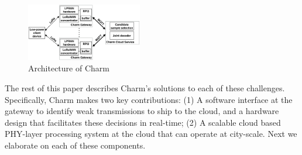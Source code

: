 \begin{figure}[!htb]
    \centering
    \compactimg
    \includegraphics[width=0.45\textwidth]{figures/charm-architecture_cropped.pdf}
    \compactimg
    \caption{Architecture of Charm}
    \label{fig:architecture}
    \compactimg
\end{figure}

The rest of this paper describes Charm's solutions to each of these
challenges. Specifically, Charm makes two key contributions: (1) A software
interface at the gateway to identify weak transmissions to ship to the cloud,
and a hardware design that facilitates these decisions in real-time; (2) A
scalable cloud based PHY-layer processing system at the cloud that can operate
at city-scale. Next we elaborate on each of these components.